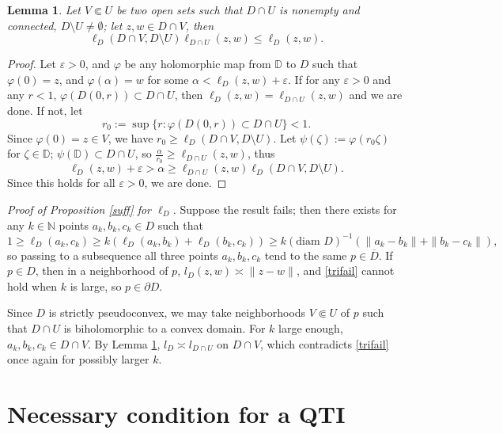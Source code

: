 \documentclass[a4paper,12pt]{amsart}
\def\D{\mathbb D}
\def\N{\mathbb N}
\newtheorem{lem}[thm]{Lemma}
\newcommand{\eps}{\varepsilon}
\newenvironment{proof*}{\vskip 2mm\noindent {}}{\hfill $\Box$ \vskip 2mm}
\begin{document}
\begin{lem}
\label{royfin}
Let $V \Subset U$ be two open sets such that $D\cap U$ is nonempty and connected, $D\setminus U \neq \emptyset$;
let $z,w \in D\cap V$,
then
\[
\ell_D (D\cap V, D\setminus U)\ell_{D\cap U}(z,w) \le \ell_D(z,w) .
\]
\end{lem}
\begin{proof}
Let $\eps>0$, and $\varphi$ be any holomorphic map from $\D$ to $D$ such that $\varphi(0)=z$, and
$\varphi(\alpha)=w$ for some $\alpha < \ell_D(z,w)+\eps$. If for any $\eps>0$ and any $r<1$, $\varphi (D(0,r))\subset D\cap U$,
then $\ell_D(z,w) =\ell_{D\cap U}(z,w) $ and we are done.  If not, let
\[
r_0:= \sup\{ r: \varphi(D(0,r)) \subset D\cap U\} <1.
\]
Since $\varphi(0)=z\in V$, we have $r_0 \ge \ell_D (D\cap V, D\setminus U)$.
Let $\psi(\zeta):= \varphi(r_0\zeta)$ for $\zeta \in \D$;
$\psi(\D)\subset D\cap U$, so $\frac\alpha{r_0} \ge\ell_{D\cap U}(z,w)$, thus
\[
 \ell_D(z,w)+\eps > \alpha \ge\ell_{D\cap U}(z,w) \ell_D (D\cap V, D\setminus U).
 \]
Since this holds for all $\eps>0$, we are done.
\end{proof}

\begin{proof*}{\it Proof of Proposition \ref{suff} for $\ell_D$.}
Suppose the result fails; then there exists for any $k\in\N$ points $a_k, b_k, c_k \in D$
such that
\begin{equation}
\label{trifail}
1 \ge \ell_D(a_k, c_k) \ge k\left( \ell_D(a_k, b_k) + \ell_D( b_k, c_k) \right) \ge
k(\mbox{diam }D)^{-1}\left( \| a_k - b_k \| + \| b_k- c_k\| \right),
\end{equation}
so passing to a subsequence all three points $a_k, b_k, c_k$ tend to the same $p\in \overline D$.
If $p\in D$, then in a neighborhood of $p$, $l_D (z,w) \asymp \|z-w\|$, and \eqref{trifail} cannot hold
when $k$ is large, so $p \in \partial D$.

Since $D$ is strictly pseudoconvex, we may take neighborhoods $V \Subset U$ of $p$ such that $D\cap U$ is biholomorphic to a convex domain. For $k$ large enough, $a_k, b_k, c_k \in D\cap V$. By Lemma \ref{royfin}, $l_D \asymp l_{D\cap U}$ on $D\cap V$,
which contradicts \eqref{trifail} once again for possibly larger $k$.
\end{proof*}

\section{Necessary condition for a QTI}
\label{neccond}
\end{document}

